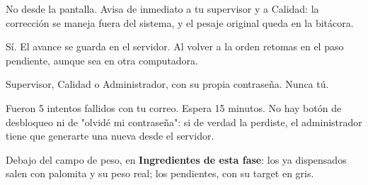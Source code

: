 No desde la pantalla. Avisa de inmediato a tu supervisor y a Calidad: la corrección
se maneja fuera del sistema, y el pesaje original queda en la bitácora.

Sí. El avance se guarda en el servidor. Al volver a la orden retomas en el paso
pendiente, aunque sea en otra computadora.

Supervisor, Calidad o Administrador, con su propia contraseña. Nunca tú.

Fueron 5 intentos fallidos con tu correo. Espera 15 minutos. No hay botón de
desbloqueo ni de "olvidé mi contraseña": si de verdad la perdiste, el administrador
tiene que generarte una nueva desde el servidor.

Debajo del campo de peso, en \textbf{Ingredientes de esta fase}: los ya dispensados
salen con palomita y su peso real; los pendientes, con su target en gris.
